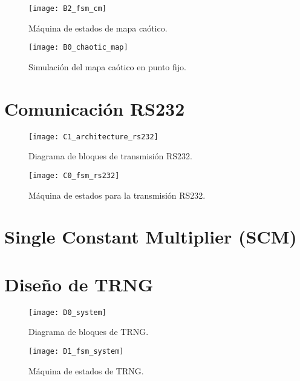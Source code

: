         \begin{figure}[hbtp]
            \caption{Máquina de estados de mapa caótico.}
            \centering
            \texttt{[image: B2\_fsm\_cm]}
            \label{fig:B2_fsm_cm}
        \end{figure}

        \begin{figure}[hbtp]
            \caption{Simulación del mapa caótico en punto fijo.}
            \centering
            \texttt{[image: B0\_chaotic\_map]}
            \label{fig:B0_chaotic_map}
        \end{figure}





    \section{Comunicación RS232}

        \begin{figure}[hbtp]
            \caption{Diagrama de bloques de transmisión RS232.}
            \centering
            \texttt{[image: C1\_architecture\_rs232]}
            \label{fig:C1_architecture_rs232}
        \end{figure}

        \begin{figure}[hbtp]
            \caption{Máquina de estados para la transmisión RS232.}
            \centering
            \texttt{[image: C0\_fsm\_rs232]}
            \label{fig:C0_fsm_rs232}
        \end{figure}	


    \section{Single Constant Multiplier (SCM)}
    \section{Diseño de TRNG}

        \begin{figure}[hbtp]
            \caption{Diagrama de bloques de TRNG.}
            \centering
            \texttt{[image: D0\_system]}
            \label{fig:D0_system}
        \end{figure}

        \begin{figure}[hbtp]
            \caption{Máquina de estados de TRNG.}
            \centering
            \texttt{[image: D1\_fsm\_system]}
            \label{fig:D1_fsm_system}
        \end{figure}







